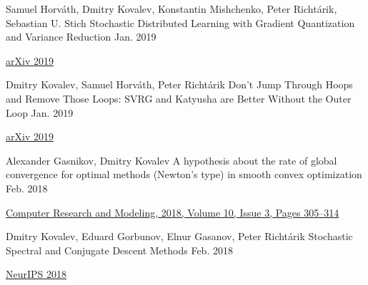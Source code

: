 \begin{cventries}
\cventry
{Samuel Horváth, Dmitry Kovalev, Konstantin Mishchenko, Peter Richtárik, Sebastian U. Stich} %
{Stochastic Distributed Learning with Gradient Quantization and Variance Reduction} %
{} %
{Jan. 2019} %
{ %
	\begin{cvitems}
		\item {\href{https://arxiv.org/abs/1904.05115}{arXiv 2019}}
	\end{cvitems}
}

\cventry
{Dmitry Kovalev, Samuel Horváth, Peter Richtárik} %
{Don't Jump Through Hoops and Remove Those Loops: SVRG and Katyusha are Better Without the Outer Loop} %
{} %
{Jan. 2019} %
{ %
	\begin{cvitems}
		\item {\href{https://arxiv.org/abs/1901.08689}{arXiv 2019}}
	\end{cvitems}
}


\cventry
{Alexander Gasnikov, Dmitry Kovalev	} %
{A hypothesis about the rate of global convergence for optimal methods (Newton's type) in smooth convex optimization } %
{} %
{Feb. 2018} %
{ %
	\begin{cvitems}
		\item {\href{http://www.mathnet.ru/php/archive.phtml?wshow=paper\&jrnid=crm\&paperid=253\&option\_lang=eng}{
				Computer Research and Modeling, 2018,	Volume 10,	Issue 3,	Pages 305–314}}
	\end{cvitems}
}


\cventry
{Dmitry Kovalev, Eduard Gorbunov, Elnur Gasanov, Peter Richtárik} %
{Stochastic Spectral and Conjugate Descent Methods} %
{} %
{Feb. 2018} %
{ %
\begin{cvitems}
\item {\href{https://papers.nips.cc/paper/7596-stochastic-spectral-and-conjugate-descent-methods}{NeurIPS 2018}}
\end{cvitems}
}



\end{cventries}
